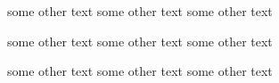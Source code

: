
some other text
some other text
some other text


some other text
some other text
some other text


some other text
some other text
some other text
